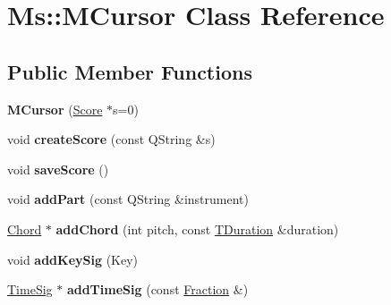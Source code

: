\hypertarget{class_ms_1_1_m_cursor}{}\section{Ms\+:\+:M\+Cursor Class Reference}
\label{class_ms_1_1_m_cursor}
\subsection*{Public Member Functions}
\begin{DoxyCompactItemize}
\item 
\mbox{\label{class_ms_1_1_m_cursor_a91a3cde1800e2d38a808dc4d2ceb7c96}} 
{\bfseries M\+Cursor} (\hyperlink{class_ms_1_1_score}{Score} $\ast$s=0)
\item 
\mbox{\label{class_ms_1_1_m_cursor_a82c602fb718a773bf329a3a718250099}} 
void {\bfseries create\+Score} (const Q\+String \&s)
\item 
\mbox{\label{class_ms_1_1_m_cursor_a91bbf62b48b248bf1ff6b009013a3692}} 
void {\bfseries save\+Score} ()
\item 
\mbox{\label{class_ms_1_1_m_cursor_a4539bdf756fd9ea18541ed34914cf588}} 
void {\bfseries add\+Part} (const Q\+String \&instrument)
\item 
\mbox{\label{class_ms_1_1_m_cursor_aa58ebe723461c8ca8bceae71d89507a8}} 
\hyperlink{class_ms_1_1_chord}{Chord} $\ast$ {\bfseries add\+Chord} (int pitch, const \hyperlink{class_ms_1_1_t_duration}{T\+Duration} \&duration)
\item 
\mbox{\label{class_ms_1_1_m_cursor_a5bdd914369366006675b8ee5b18c887b}} 
void {\bfseries add\+Key\+Sig} (Key)
\item 
\mbox{\label{class_ms_1_1_m_cursor_ac2c63cdbb00854f9dcadc36ebc9b4765}} 
\hyperlink{class_ms_1_1_time_sig}{Time\+Sig} $\ast$ {\bfseries add\+Time\+Sig} (const \hyperlink{class_ms_1_1_fraction}{Fraction} \&)
\item 
\mbox{\label{class_ms_1_1_m_cursor_a5f6bf75e7e2b8eaa754af78ddd58d398}} 

\end{DoxyCompactItemize}
